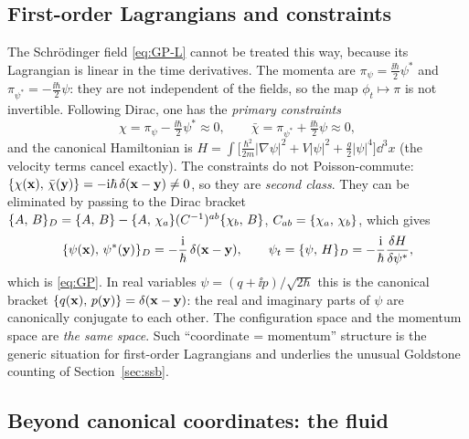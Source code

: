 \subsection{First-order Lagrangians and constraints}
\label{sec:constraints}

The Schr\"odinger field \eqref{eq:GP-L} cannot be treated this way, because
its Lagrangian is linear in the time derivatives. The momenta are
$\pi_\psi=\tfrac{\ii\hbar}2\psi^*$ and $\pi_{\psi^*}=-\tfrac{\ii\hbar}2\psi$: they are
not independent of the fields, so the map $\phi_t\mapsto\pi$ is not invertible.
Following Dirac, one has the \emph{primary constraints}
\begin{equation}
  \chi=\pi_\psi-\tfrac{\ii\hbar}{2}\psi^*\approx0,\qquad
  \bar\chi=\pi_{\psi^*}+\tfrac{\ii\hbar}{2}\psi\approx0 ,
\end{equation}
and the canonical Hamiltonian is $H=\int\big[\tfrac{\hbar^2}{2m}|\nabla\psi|^2+V|\psi|^2+\tfrac g2|\psi|^4\big]\dd^3x$
(the velocity terms cancel exactly). The constraints do not Poisson-commute:
$\{\chi(\mathbf{x}),\,\bar\chi(\mathbf{y})\}=-\mathrm{i}\hbar\,\delta(\mathbf{x}-\mathbf{y})\neq0$,
so they are \emph{second class}. They can be eliminated by passing to the Dirac bracket
$\{A,\,B\}_D=\{A,\,B\}-\{A,\,\chi_a\}(C^{-1})^{ab}\{\chi_b,\,B\}$,
$C_{ab}=\{\chi_a,\,\chi_b\}$, which gives
\begin{equation}
  \{\psi(\mathbf{x}),\,\psi^*(\mathbf{y})\}_D=-\frac{\mathrm{i}}{\hbar}\,\delta(\mathbf{x}-\mathbf{y}),
  \qquad
  \psi_t=\{\psi,\,H\}_D=-\frac{\mathrm{i}}{\hbar}\frac{\delta H}{\delta \psi^*},
\end{equation}
which is \eqref{eq:GP}. In real variables $\psi=(q+\ii p)/\sqrt{2\hbar}$ this is
the canonical bracket $\{q(\mathbf{x}),\,p(\mathbf{y})\}=\delta(\mathbf{x}-\mathbf{y})$:
the real and imaginary parts of $\psi$ are canonically conjugate to each other. The
configuration space and the momentum space are \emph{the same space}. Such
``coordinate = momentum'' structure is the generic situation for first-order
Lagrangians and underlies the unusual Goldstone counting of
Section~\ref{sec:ssb}.

\subsection{Beyond canonical coordinates: the fluid}

